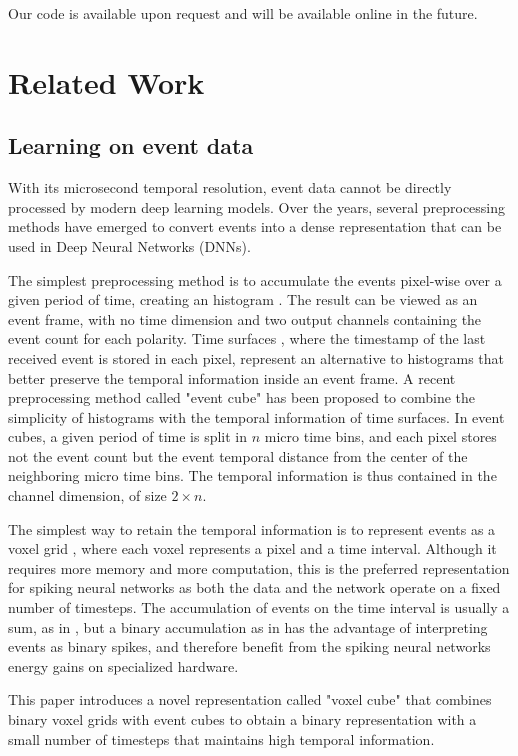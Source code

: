 \documentclass[conference]{IEEEtran}
\begin{document}
Our code is available upon request and will be available online in the future.

\section{Related Work}
\subsection{Learning on event data}
With its microsecond temporal resolution, event data cannot be directly processed by modern deep learning models. Over the years, several preprocessing methods have emerged to convert events into a dense representation that can be used in Deep Neural Networks (DNNs).

The simplest preprocessing method is to accumulate the events pixel-wise over a given period of time, creating an histogram \cite{steering2018}. The result can be viewed as an event frame, with no time dimension and two output channels containing the event count for each polarity. Time surfaces \cite{hots}, where the timestamp of the last received event is stored in each pixel, represent an alternative to histograms that better preserve the temporal information inside an event frame. A recent preprocessing method called "event cube" \cite{eventcube} has been proposed to combine the simplicity of histograms with the temporal information of time surfaces. In event cubes, a given period of time is split in $n$ micro time bins, and each pixel stores not the event count but the event temporal distance from the center of the neighboring micro time bins. The temporal information is thus contained in the channel dimension, of size $2 \times n$.

The simplest way to retain the temporal information is to represent events as a voxel grid \cite{voxel}, where each voxel represents a pixel and a time interval. Although it requires more memory and more computation, this is the preferred representation for spiking neural networks as both the data and the network operate on a fixed number of timesteps. The accumulation of events on the time interval is usually a sum, as in \cite{plif}, but a binary accumulation as in \cite{loicijcnn} has the advantage of interpreting events as binary spikes, and therefore benefit from the spiking neural networks energy gains on specialized hardware. 

This paper introduces a novel representation called "voxel cube" that combines binary voxel grids with event cubes to obtain a binary representation with a small number of timesteps that maintains high temporal information.
\end{document}
